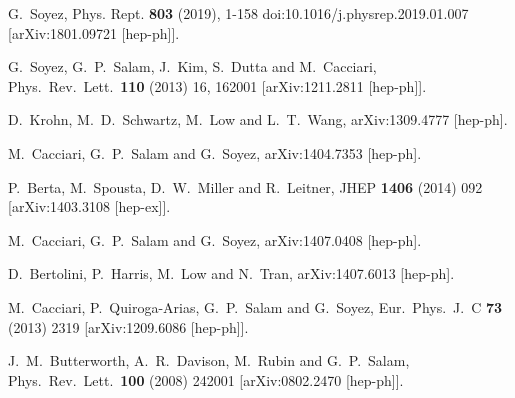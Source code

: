 \documentclass[12pt,a4]{article}
\begin{document}
\begin{thebibliography}{99}
G.~Soyez,
Phys. Rept. \textbf{803} (2019), 1-158
doi:10.1016/j.physrep.2019.01.007
[arXiv:1801.09721 [hep-ph]].

  G.~Soyez, G.~P.~Salam, J.~Kim, S.~Dutta and M.~Cacciari,
  Phys.\ Rev.\ Lett.\  {\bf 110} (2013) 16,  162001
  [arXiv:1211.2811 [hep-ph]].

  D.~Krohn, M.~D.~Schwartz, M.~Low and L.~T.~Wang,
  arXiv:1309.4777 [hep-ph].

  M.~Cacciari, G.~P.~Salam and G.~Soyez,
  arXiv:1404.7353 [hep-ph].

  P.~Berta, M.~Spousta, D.~W.~Miller and R.~Leitner,
  JHEP {\bf 1406} (2014) 092
  [arXiv:1403.3108 [hep-ex]].


  M.~Cacciari, G.~P.~Salam and G.~Soyez,
  arXiv:1407.0408 [hep-ph].

  D.~Bertolini, P.~Harris, M.~Low and N.~Tran,
  arXiv:1407.6013 [hep-ph].


  M.~Cacciari, P.~Quiroga-Arias, G.~P.~Salam and G.~Soyez,
  Eur.\ Phys.\ J.\ C {\bf 73} (2013) 2319
  [arXiv:1209.6086 [hep-ph]].


  J.~M.~Butterworth, A.~R.~Davison, M.~Rubin and G.~P.~Salam,
  Phys.\ Rev.\ Lett.\  {\bf 100} (2008) 242001
  [arXiv:0802.2470 [hep-ph]].


\end{thebibliography}
\end{document}
